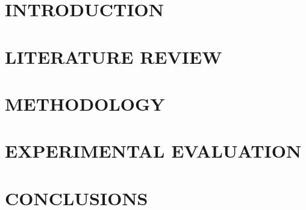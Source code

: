 \documentclass[a4paper,oneside]{report}
\theoremstyle{definition}
\begin{document}
\renewcommand\appendixname{APPENDIX}
\renewcommand\appendixpagename{APPENDIX}
\renewcommand\appendixtocname{APPENDIX}

\renewcommand{\figurename}{Figure}
\renewcommand{\tablename}{Table}
\renewcommand{\chaptername}{CHAPTER}



\newpage
{}
\hypersetup{pageanchor=true}

\pagestyle{fancy}
\fancyhf{}
\fancyhead[R]{\leftmark}
\fancyfoot[R]{\thepage}

\chapter{INTRODUCTION}

\newpage
\chapter{LITERATURE REVIEW}



\newpage
\chapter{METHODOLOGY}


\newpage
\chapter{EXPERIMENTAL EVALUATION}


% 

\newpage
\chapter{CONCLUSIONS}

\end{document}
